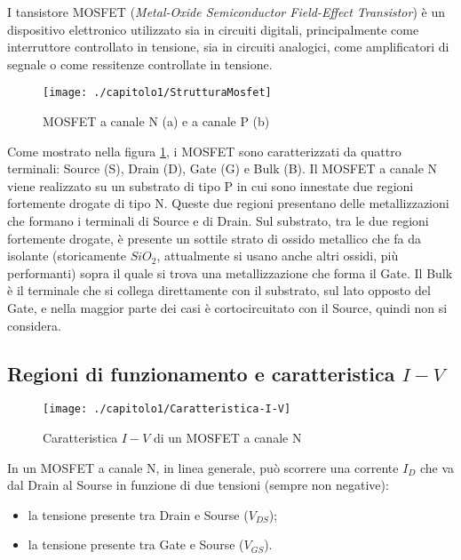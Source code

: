 I tansistore MOSFET (\emph{Metal-Oxide Semiconductor Field-Effect Transistor}) è un dispositivo elettronico utilizzato sia in circuiti digitali, principalmente come interruttore controllato in tensione, sia in circuiti analogici, come amplificatori di segnale o come ressitenze controllate in tensione.\\

\begin{figure}[H]
  \centering
  \texttt{[image: ./capitolo1/StrutturaMosfet]}
  \caption[Struttura dei MOSFET]{MOSFET a canale N (a) e a canale P (b)}
  \label{fig:StrutturaMosfet}
\end{figure}

Come mostrato nella figura \ref{fig:StrutturaMosfet}, i MOSFET sono caratterizzati da quattro terminali: Source (S), Drain (D), Gate (G) e Bulk (B).
Il MOSFET a canale N viene realizzato su un substrato di tipo P in cui sono innestate due regioni fortemente drogate di tipo N. Queste due regioni presentano delle metallizzazioni che formano i terminali di Source e di Drain. Sul substrato, tra le due regioni fortemente drogate, è presente un sottile strato di ossido metallico che fa da isolante (storicamente $SiO_2$, attualmente si usano anche altri ossidi, più performanti) sopra il quale si trova una metallizzazione che forma il Gate. Il Bulk è il terminale che si collega direttamente con il substrato, sul lato opposto del Gate, e nella maggior parte dei casi è cortocircuitato con il Source, quindi non si considera.\\

\subsection{Regioni di funzionamento e caratteristica $I-V$}

\begin{figure}[H]
  \centering
  \texttt{[image: ./capitolo1/Caratteristica-I-V]}
  \caption[Caratteristica $I-V$ di un MOSFET a canale N]{Caratteristica $I-V$ di un MOSFET a canale N}
  \label{fig:caratteristica-I-V}
\end{figure}

In un MOSFET a canale N, in linea generale, può scorrere una corrente $I_D$ che va dal Drain al Sourse in funzione di due tensioni (sempre non negative): 
\begin{itemize}
  \item la tensione presente tra Drain e Sourse ($V_{DS}$);
  \item la tensione presente tra Gate e Sourse ($V_{GS}$).  
\end{itemize}

